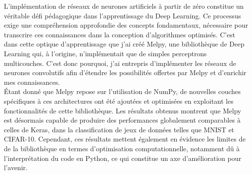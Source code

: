 L’implémentation de réseaux de neurones artificiels à partir de zéro constitue un véritable défi 
pédagogique dans l’apprentissage du Deep Learning. Ce processus exige une compréhension approfondie 
des concepts fondamentaux, nécessaire pour transcrire ces connaissances dans la conception d’algorithmes 
optimisés. C’est dans cette optique d'apprentissage que j’ai créé Melpy, une bibliothèque 
de Deep Learning qui, à l’origine, n’implémentait que de simples perceptrons multicouches. C'est donc pourquoi, 
j’ai entrepris d’implémenter les réseaux de neurones convolutifs afin d’étendre les possibilités offertes par 
Melpy et d’enrichir mes connaissances. \\


Étant donné que Melpy repose sur l’utilisation de NumPy, de nouvelles couches spécifiques à ces architectures 
ont été ajoutées et optimisées en exploitant les fonctionnalités de cette bibliothèque. Les résultats obtenus 
montrent que Melpy est désormais capable de produire des performances globalement comparables à celles de Keras, 
dans la classification de jeux de données telles que MNIST et CIFAR-10. Cependant, ces résultats mettent également 
en évidence les limites de de la bibliothèque en termes d’optimisation computationnelle, notamment dû à l'interprétation
du code en Python, ce qui constitue un axe d'amélioration pour l'avenir.